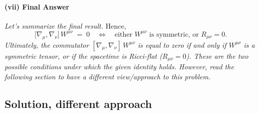 \documentclass{article}
\begin{document}
\paragraph{(vii) Final Answer}
\textit{Let's summarize the final result.}
Hence, 
\[
\bigl[\nabla_{\mu}, \nabla_{\nu}\bigr]\,W^{\mu\nu} 
\;=\;0
\quad
\Longleftrightarrow
\quad
\text{either }W^{\mu\nu}\text{ is symmetric, or }R_{\mu\nu}=0.
\]
\textit{Ultimately, the commutator \([\nabla_{\mu}, \nabla_{\nu}]\,W^{\mu\nu}\) is equal to zero if and only if \(W^{\mu\nu}\) is a symmetric tensor, or if the spacetime is Ricci-flat (\(R_{\mu\nu}=0\)). These are the two possible conditions under which the given identity holds.
However, read the following section to have a different view/approach to this problem.}

\subsection*{Solution, different approach}
\end{document}
